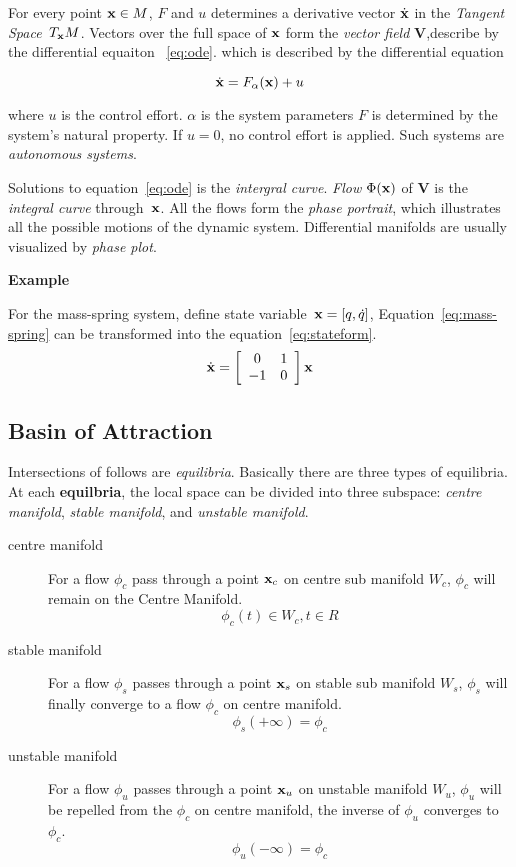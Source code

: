 For every point $\mathbf{x} \in M$, 
$F$ and $u$ determines a derivative vector $\dot{\mathbf{x}}$ in the \emph{Tangent Space}~$T_{\mathbf{x}}M$. 
Vectors over the full space of $\mathbf{x}$ form the \emph{vector field} $\mathbf{V}$,describe by the differential equaiton~ \ref{eq:ode}.
which is described by the differential equation

\begin{equation}
\label{eq:ode}
\dot{\mathbf{x}}=F_{\alpha}(\mathbf{x})+u
\end{equation}



where $u$ is the control effort. 
$\alpha$ is the system parameters
$F$ is determined by the system's natural property.
If $u=0$,  no control effort is applied.
Such systems are \emph{autonomous systems}. 

Solutions to equation~\ref{eq:ode} is the \emph{intergral curve}. 
\emph{Flow} $\Phi(\mathbf{x})$ of $\mathbf{V}$ is the \emph{integral curve} through~$\mathbf{x}$. 
All the flows form the \emph{phase portrait}, which illustrates all the possible motions of the dynamic system.
Differential manifolds are usually visualized by \emph{phase plot}.

\textbf{Example}

For the mass-spring system, define state variable~$\mathbf{x}=[q,\dot{q}]$, Equation~\ref{eq:mass-spring} can be transformed into the equation~\ref{eq:stateform}.
\begin{equation}
\label{eq:stateform}
\dot{\mathbf{x}}=
\left[ 
\begin{array}{cc}
0 &1\\
-1 &0 
\end{array}
\right]\mathbf{x}
\end{equation}



\subsection{Basin of Attraction}
Intersections of follows are \emph{equilibria}.
Basically there are three types of equilibria.
At each \textbf{equilbria}, the local space can be divided into three subspace: 
\emph{centre manifold}, \emph{stable manifold}, and \emph{unstable manifold}.
\begin{description} 
\item[centre manifold]
For a flow $\phi_c$ pass through a point $\mathbf{x}_{c}$ on centre sub manifold $W_{c}$, $\phi_c$ will remain on the Centre Manifold. 
\[
\phi_{c}(t) \in W_{c}, t \in R
\]

\item [stable manifold]
For a flow $\phi_{s}$ passes through a point $\mathbf{x}_{s}$ on stable sub manifold $W_{s}$, $\phi_s$ will finally converge to a flow $\phi_c$ on centre manifold.
\[
\phi_{s}(+\infty)=\phi_{c}
\]
\item[unstable manifold]
For a flow $\phi_u$ passes through a point $\mathbf{x}_u$ on unstable manifold $W_{u}$, $\phi_u$ will be repelled from the $\phi_c$ on centre manifold, the inverse of $\phi_u$ converges to $\phi_c$. 
\[
\phi_{u}(-\infty)=\phi_{c}
\] 
\end{description}


